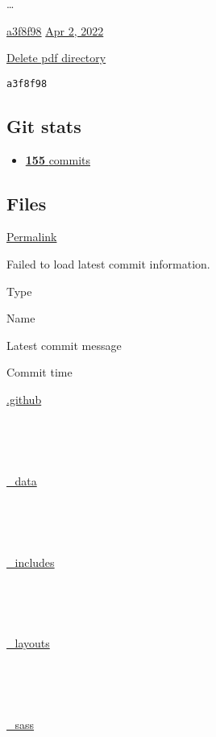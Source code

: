 \documentclass[
  english,
]{article}
\providecommand{\tightlist}{%
  \setlength{\itemsep}{0pt}\setlength{\parskip}{0pt}}
\begin{document}
\ldots{}

\href{/CptMike/online-cv/commit/a3f8f985a16f2768fce052b7d2ded3d55f6ea65d}{a3f8f98}
\href{/CptMike/online-cv/commit/a3f8f985a16f2768fce052b7d2ded3d55f6ea65d}{Apr
2, 2022}

\href{/CptMike/online-cv/commit/a3f8f985a16f2768fce052b7d2ded3d55f6ea65d}{Delete
pdf directory}

\texttt{a3f8f98}

\hypertarget{git-stats}{%
\subsection{Git stats}\label{git-stats}}

\begin{itemize}
\tightlist
\item
  \href{/CptMike/online-cv/commits/master}{ { \textbf{155} { commits }
  }}
\end{itemize}

\hypertarget{files}{%
\subsection{Files}\label{files}}

\href{/CptMike/online-cv/tree/a3f8f985a16f2768fce052b7d2ded3d55f6ea65d}{Permalink}

Failed to load latest commit information.

Type

Name

Latest commit message

Commit time

{\href{/CptMike/online-cv/tree/master/.github}{.github}}

~

~

{\href{/CptMike/online-cv/tree/master/_data}{\_data}}

~

~

{\href{/CptMike/online-cv/tree/master/_includes}{\_includes}}

~

~

{\href{/CptMike/online-cv/tree/master/_layouts}{\_layouts}}

~

~

{\href{/CptMike/online-cv/tree/master/_sass}{\_sass}}

~

~
\end{document}
